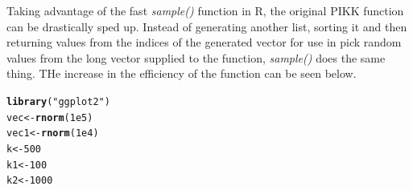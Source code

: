 \documentclass{article}\usepackage[]{graphicx}\usepackage[]{color}
\makeatletter
\newcommand{\hlnum}[1]{\textcolor[rgb]{0.686,0.059,0.569}{#1}}%
\newcommand{\hlstr}[1]{\textcolor[rgb]{0.192,0.494,0.8}{#1}}%
\newcommand{\hlstd}[1]{\textcolor[rgb]{0.345,0.345,0.345}{#1}}%
\newcommand{\hlkwb}[1]{\textcolor[rgb]{0.69,0.353,0.396}{#1}}%
\newcommand{\hlkwd}[1]{\textcolor[rgb]{0.737,0.353,0.396}{\textbf{#1}}}%
\newenvironment{kframe}{%
 \def\at@end@of@kframe{}%
 \ifinner\ifhmode%
  \def\at@end@of@kframe{\end{minipage}}%
  \begin{minipage}{\columnwidth}%
 \fi\fi%
 \def\FrameCommand##1{\hskip\@totalleftmargin \hskip-\fboxsep
 \colorbox{shadecolor}{##1}\hskip-\fboxsep
     \hskip-\linewidth \hskip-\@totalleftmargin \hskip\columnwidth}%
 \MakeFramed {\advance\hsize-\width
   \@totalleftmargin\z@ \linewidth\hsize
   \@setminipage}}%
 {\par\unskip\endMakeFramed%
 \at@end@of@kframe}
\newenvironment{knitrout}{}{} %
\makeatother
\begin{document}
Taking advantage of the fast \emph{sample()} function in R, the original PIKK function can be drastically sped up.  Instead of generating another list, sorting it and then returning values from the indices of the generated vector for use in pick random values from the long vector supplied to the function, \emph{sample()} does the same thing.  THe increase in the efficiency of the function can be seen below.
\begin{knitrout}
\color{fgcolor}\begin{kframe}
\begin{alltt}
\hlkwd{library}\hlstd{(}\hlstr{"ggplot2"}\hlstd{)}
\hlstd{vec} \hlkwb{<-} \hlkwd{rnorm}\hlstd{(}\hlnum{1e5}\hlstd{)}
\hlstd{vec1} \hlkwb{<-} \hlkwd{rnorm}\hlstd{(}\hlnum{1e4}\hlstd{)}
\hlstd{k} \hlkwb{<-} \hlnum{500}
\hlstd{k1} \hlkwb{<-} \hlnum{100}
\hlstd{k2} \hlkwb{<-} \hlnum{1000}


\end{alltt}
\end{kframe}
\end{knitrout}
\end{document}
